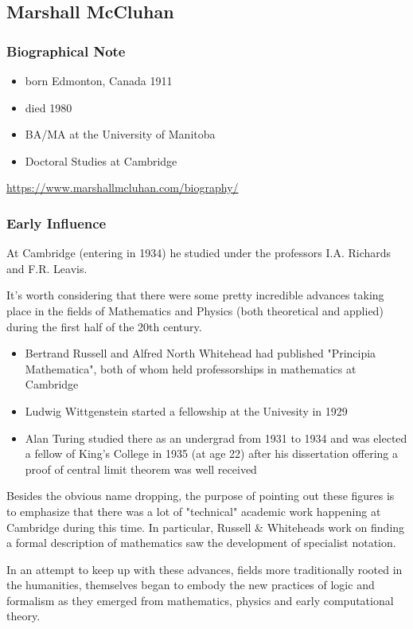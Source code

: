 \documentclass[11pt]{article}
\begin{document}
\subsection{Marshall McCluhan}
\label{sec:orgaccb33f}
\subsubsection{Biographical Note}
\label{sec:org8bc78aa}
\begin{itemize}
\item born Edmonton, Canada 1911
\item died 1980
\item BA/MA at the University of Manitoba
\item Doctoral Studies at Cambridge
\end{itemize}
\url{https://www.marshallmcluhan.com/biography/}


\subsubsection{Early Influence}
\label{sec:orgdd28afe}
At Cambridge (entering in 1934) he studied under the professors I.A. Richards and
F.R. Leavis.

It's worth considering that there were some pretty incredible advances
taking place in the fields of Mathematics and Physics (both
theoretical and applied) during the first half of the 20th century. 

\begin{itemize}
\item Bertrand Russell and Alfred North Whitehead had published "Principia
Mathematica", both of whom held professorships in mathematics at Cambridge
\item Ludwig Wittgenstein started a fellowship at the Univesity in 1929
\item Alan Turing studied there as an undergrad from 1931 to 1934 and was
elected a fellow of King's College in 1935 (at age 22) after his
dissertation offering a proof of central limit theorem was well
received
\end{itemize}

Besides the obvious name dropping, the purpose of pointing out these
figures is to emphasize that there was a lot of "technical" academic
work happening at Cambridge during this time. In particular, Russell \&
Whiteheads work on finding a formal description of mathematics saw the
development of specialist notation.

In an attempt to keep up with these advances, fields more
traditionally rooted in the humanities, themselves began to embody the
new practices of logic and formalism as they emerged from mathematics,
physics and early computational theory. 
\end{document}
